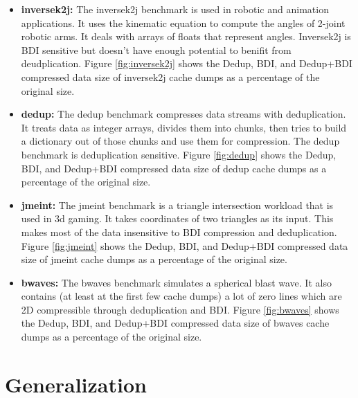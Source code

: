 \begin{itemize}
    \item \textbf{inversek2j:} The inversek2j benchmark\cite{axbench} is used in robotic and animation applications. It uses the kinematic equation to compute the angles of 2-joint robotic arms. It deals with arrays of floats that represent angles. Inversek2j is BDI sensitive but doesn't have enough potential to benifit from deudplication. Figure \ref{fig:inversek2j} shows the Dedup, BDI, and Dedup+BDI compressed data size of inversek2j cache dumps as a percentage of the original size.
    \item \textbf{dedup:} The dedup benchmark\cite{parsec} compresses data streams with deduplication. It treats data as integer arrays, divides them into chunks, then tries to build a dictionary out of those chunks and use them for compression. The dedup benchmark is deduplication sensitive. Figure \ref{fig:dedup} shows the Dedup, BDI, and Dedup+BDI compressed data size of dedup cache dumps as a percentage of the original size.
    \item \textbf{jmeint:} The jmeint benchmark\cite{axbench} is a triangle intersection workload that is used in 3d gaming. It takes coordinates of two triangles as its input. This makes most of the data insensitive to BDI compression and deduplication. Figure \ref{fig:jmeint} shows the Dedup, BDI, and Dedup+BDI compressed data size of jmeint cache dumps as a percentage of the original size.
    \item \textbf{bwaves:} The bwaves benchmark\cite{spec} simulates a spherical blast wave. It also contains (at least at the first few cache dumps) a lot of zero lines which are 2D compressible through deduplication and BDI. Figure \ref{fig:bwaves} shows the Dedup, BDI, and Dedup+BDI compressed data size of bwaves cache dumps as a percentage of the original size.
\end{itemize}

\section{Generalization}
\label{Generalization}

